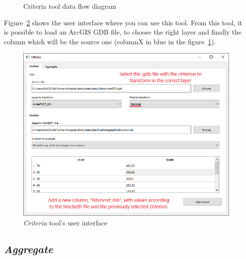 \documentclass[11pt]{article}
\begin{document}
\begin{figure}[H]
    \centering
    
    \caption{Criteria tool data flow diagram}
    \label{fig:criteria-tool}
\end{figure}

Figure~\ref{fig:criteria-ui} shows the user interface where you can use this tool.
From this tool, it is possible to load an ArcGIS GDB file,
to choose the right layer and finally the column which will be the source one
(columnX in blue in the figure~\ref{fig:criteria-tool}).

\begin{figure}[H]
    \includegraphics[width=\linewidth]{../images/criteria_tool.png}
    \caption{\textit{Criteria} tool's user interface}
    \label{fig:criteria-ui}
\end{figure}

\subsection{\textit{Aggregate}}\label{subsec:aggregate}
\end{document}
